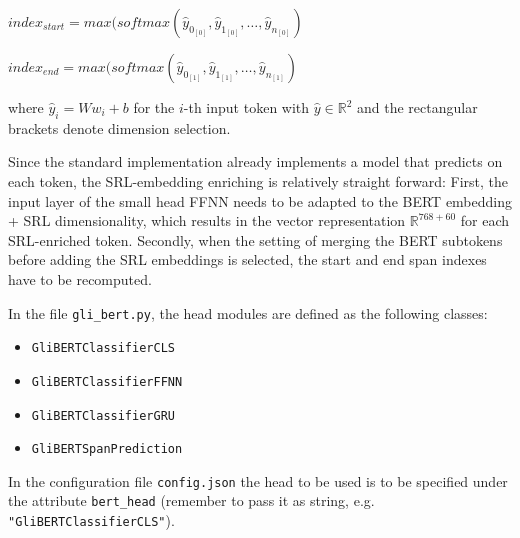 $index_{start} = max(softmax(\hat{y}_{0_{[0]}}, \hat{y}_{1_{[0]}}, \dotso , \hat{y}_{n_{[0]}})$

$index_{end} = max(softmax(\hat{y}_{0_{[1]}}, \hat{y}_{1_{[1]}}, \dotso , \hat{y}_{n_{[1]}})$

where $\hat{y}_i = Ww_i+b$ for the $i$-th input token with $\hat{y} \in \mathbb{R}^2$ and
the rectangular brackets denote dimension selection.

Since the standard implementation already implements a model that predicts on each token,
the SRL-embedding enriching is relatively straight forward:
First, the input layer of the small head FFNN needs to be adapted to the BERT embedding + SRL
dimensionality, which results in the vector representation $\mathbb{R}^{768+60}$ for each
SRL-enriched token. Secondly, when the setting of merging the BERT subtokens before adding
the SRL embeddings is selected, the start and end span indexes have to be recomputed.


\begin{tcolorbox}[
  colback=blue!5!white,
  colframe=blue!75!black,
  title={\centering Code}]

  In the file \texttt{gli\_bert.py}, the head modules are defined as the following classes:

  \begin{itemize}
    \itemsep0em
    \item[] \texttt{GliBERTClassifierCLS}
    \item[] \texttt{GliBERTClassifierFFNN}
    \item[] \texttt{GliBERTClassifierGRU}
    \item[] \texttt{GliBERTSpanPrediction}
  \end{itemize}

  In the configuration file \texttt{config.json} the head to be used is to be
  specified under the attribute \texttt{bert\_head} (remember to pass it as string, e.g. \texttt{"GliBERTClassifierCLS"}).
\end{tcolorbox}



